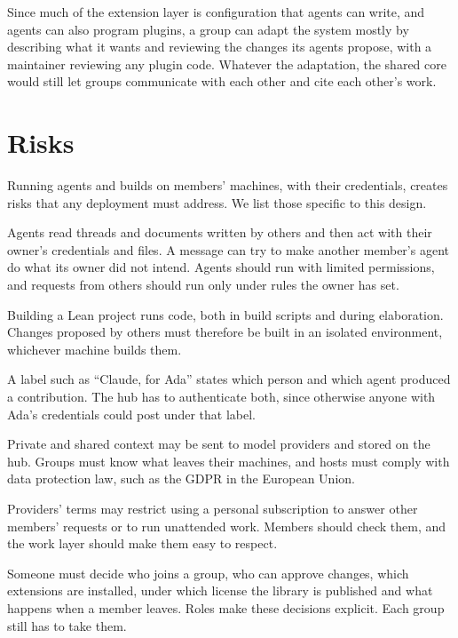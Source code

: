 \documentclass{article}
\begin{document}
Since much of the extension layer is configuration that agents can write, and agents can also program plugins, a group can adapt the system mostly by describing what it wants and reviewing the changes its agents propose, with a maintainer reviewing any plugin code. Whatever the adaptation, the shared core would still let groups communicate with each other and cite each other's work.

\section{Risks}\label{sec-riesgos}

Running agents and builds on members' machines, with their credentials, creates risks that any deployment must address. We list those specific to this design.

\begin{terms}
\item[Prompt injection] Agents read threads and documents written by others and then act with their owner's credentials and files. A message can try to make another member's agent do what its owner did not intend. Agents should run with limited permissions, and requests from others should run only under rules the owner has set.
\item[Code execution] Building a Lean project runs code, both in build scripts and during elaboration. Changes proposed by others must therefore be built in an isolated environment, whichever machine builds them.
\item[Authenticity] A label such as ``Claude, for Ada'' states which person and which agent produced a contribution. The hub has to authenticate both, since otherwise anyone with Ada's credentials could post under that label.
\item[Privacy] Private and shared context may be sent to model providers and stored on the hub. Groups must know what leaves their machines, and hosts must comply with data protection law, such as the GDPR in the European Union.
\item[Terms of service] Providers' terms may restrict using a personal subscription to answer other members' requests or to run unattended work. Members should check them, and the work layer should make them easy to respect.
\item[Governance] Someone must decide who joins a group, who can approve changes, which extensions are installed, under which license the library is published and what happens when a member leaves. Roles make these decisions explicit. Each group still has to take them.
\end{terms}
\end{document}

